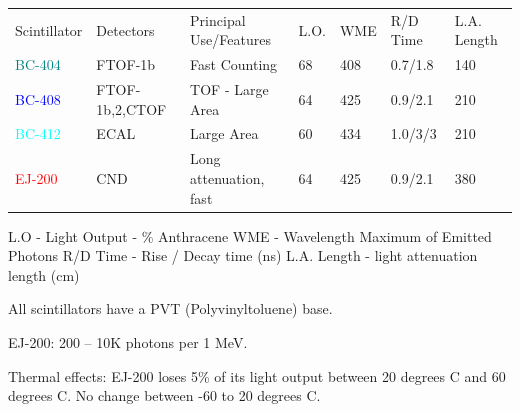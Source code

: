                
            \begin{table}[H]
                \centering
                    \begin{tabular}{lllllll}
                        Scintillator                    & Detectors             &   Principal Use/Features      &   L.O. & WME & R/D Time & L.A. Length \\
                         \textcolor{teal}{BC-404}       &  FTOF-1b              &   Fast Counting                   &           68    &   408    & 0.7/1.8           &   140   \\
                         \textcolor{blue}{BC-408}       &  FTOF-1b,2,CTOF       &   TOF - Large Area                &           64    &   425   &   0.9/2.1         &   210  \\
                        \textcolor{cyan}{BC-412}        &  ECAL                 &   Large Area                      &           60   &   434 &   1.0/3/3         &   210\\
                        \textcolor{red}{EJ-200}        &  CND                  &   Long attenuation, fast   &           64     &   425       &   0.9/2.1         &   380   \\
                    \end{tabular}
            \end{table}   
            
            L.O - Light Output - \% Anthracene
            WME - Wavelength Maximum of Emitted Photons
            R/D Time - Rise / Decay time (ns)
            L.A. Length - light attenuation length (cm)
             
             All scintillators have a PVT (Polyvinyltoluene) base. 
             
             EJ-200:          200 -- 10K photons per 1 MeV. 
             
             Thermal effects: EJ-200 loses 5\% of its light output between 20 degrees C and 60 degrees C. No change between -60 to 20 degrees C. 
            

